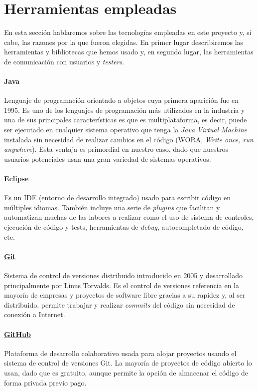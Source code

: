 \section{Herramientas empleadas}

En esta sección hablaremos sobre las tecnologías empleadas en este proyecto y, si cabe, las razones por la que fueron elegidas. En primer lugar describiremos las herramientas y bibliotecas que hemos usado y, en segundo lugar, las herramientas de comunicación con usuarios y \textit{testers}.

\paragraph{Java} Lenguaje de programación orientado a objetos cuya primera aparición fue en 1995. Es uno de los lenguajes de programación más utilizados en la industria y una de sus principales características es que es multiplataforma, es decir, puede ser ejecutado en cualquier sistema operativo que tenga la \textit{Java Virtual Machine} instalada sin necesidad de realizar cambios en el código (WORA, \textit{Write once, run anywhere}). Esta ventaja es primordial en nuestro caso, dado que nuestros usuarios potenciales usan una gran variedad de sistemas operativos.

 \paragraph{\href{https://eclipse.org}{Eclipse}} Es un IDE (entorno de desarrollo integrado) usado para escribir código en múltiples idiomas. También incluye una serie de \textit{plugins} que facilitan y automatizan muchas de las labores a realizar como el uso de sistema de controles, ejecución de código y tests, herramientas de \textit{debug}, autocompletado de código, etc.

 \paragraph{\href{https://goo.gl/IKsKt5}{Git}} Sistema de control de versiones distribuido introducido en 2005 y desarrollado principalmente por Linus Torvalds. Es el control de versiones referencia en la mayoría de empresas y proyectos de software libre gracias a su rapidez y, al ser distribuido, permite trabajar y realizar \textit{commits} del código sin necesidad de conexión a Internet.

 \paragraph{\href{github.com}{GitHub}} Plataforma de desarrollo colaborativo usada para alojar proyectos usando el sistema de control de versiones Git. La mayoría de proyectos de código abierto lo usan, dado que es gratuito, aunque permite la opción de almacenar el código de forma privada previo pago.

